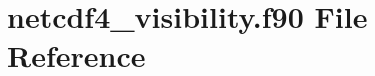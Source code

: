 \hypertarget{netcdf4__visibility_8f90}{}\section{netcdf4\+\_\+visibility.\+f90 File Reference}
\label{netcdf4__visibility_8f90}
